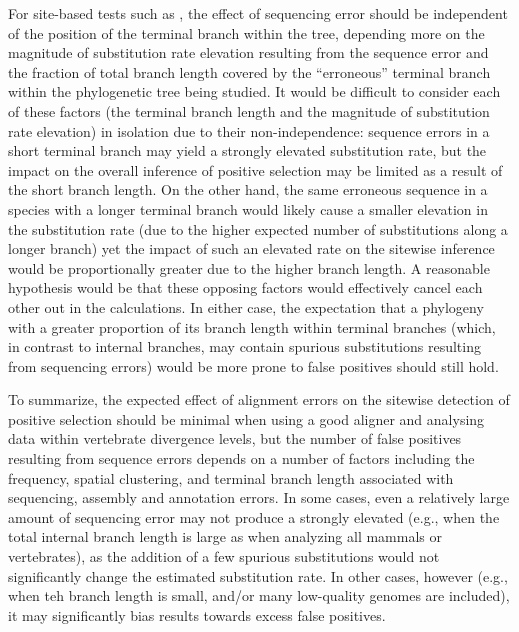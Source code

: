 For site-based tests such as \slr, the effect of sequencing error
should be independent of the position of the terminal branch within
the tree, depending more on the magnitude of \nsyn substitution rate
elevation resulting from the sequence error and the fraction of total
branch length covered by the ``erroneous'' terminal branch within the
phylogenetic tree being studied. It would be difficult to consider
each of these factors (the terminal branch length and the magnitude of
\nsyn substitution rate elevation) in isolation due to their
non-independence: sequence errors in a short terminal branch may yield
a strongly elevated \nsyn substitution rate, but the impact on the
overall inference of positive selection may be limited as a result of
the short branch length. On the other hand, the same erroneous
sequence in a species with a longer terminal branch would likely cause
a smaller elevation in the \nsyn substitution rate (due to the higher
expected number of substitutions along a longer branch) yet the impact
of such an elevated rate on the sitewise inference would be
proportionally greater due to the higher branch length. A reasonable
hypothesis would be that these opposing factors would effectively
cancel each other out in the \ml calculations. In either case, the
expectation that a phylogeny with a greater proportion of its branch
length within terminal branches (which, in contrast to internal
branches, may contain spurious substitutions resulting from sequencing
errors) would be more prone to false positives should still hold.

To summarize, the expected effect of alignment errors on the sitewise
detection of positive selection should be minimal when using a good
aligner and analysing data within vertebrate divergence levels, but
the number of false positives resulting from sequence errors depends
on a number of factors including the frequency, spatial clustering,
and terminal branch length associated with sequencing, assembly and
annotation errors. In some cases, even a relatively large amount of
sequencing error may not produce a strongly elevated \fpr (e.g., when
the total internal branch length is large as when analyzing all
mammals or vertebrates), as the addition of a few spurious
substitutions would not significantly change the estimated \nsyn
substitution rate. In other cases, however (e.g., when teh branch
length is small, and/or many low-quality genomes are included), it may
significantly bias results towards excess false positives.

